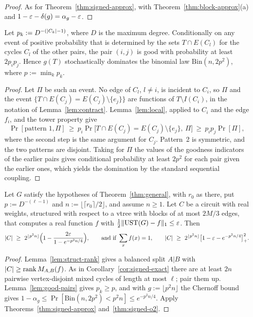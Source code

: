 \begin{proof}
As for Theorem~\ref{thm:signed-approx}, with Theorem~\ref{thm:block-approx}(a) and $1-\varepsilon-\delta(g)=\alpha_g-\varepsilon$.
\end{proof}

\begin{lemma}\label{lem:good-pairs}
Let $p_k:=D^{-(\lvert C_k\rvert-1)}$, where $D$ is the maximum degree. Conditionally on any event of positive probability that is determined by the sets $T\cap E(C_l)$ for the cycles $C_l$ of the other pairs, the pair $(i,j)$ is good with probability at least $2p_ip_j$. Hence $g(T)$ stochastically dominates the binomial law $\mathrm{Bin}(n,2p^2)$, where $p:=\min_kp_k$.
\end{lemma}

\begin{proof}
Let $\Pi$ be such an event. No edge of $C_l$, $l\ne i$, is incident to $C_i$, so $\Pi$ and the event $\{T\cap E(C_j)=E(C_j)\setminus\{e_j\}\}$ are functions of $T\setminus I(C_i)$, in the notation of Lemma~\ref{lem:contract}. Lemma~\ref{lem:local}, applied to $C_i$ and the edge $f_i$, and the tower property give
\[
  \Pr[\text{pattern 1},\Pi]\ \ge\ p_i\Pr\bigl[T\cap E(C_j)=E(C_j)\setminus\{e_j\},\ \Pi\bigr]\ \ge\ p_ip_j\Pr[\Pi],
\]
where the second step is the same argument for $C_j$. Pattern~2 is symmetric, and the two patterns are disjoint. Taking for $\Pi$ the values of the goodness indicators of the earlier pairs gives conditional probability at least $2p^2$ for each pair given the earlier ones, which yields the domination by the standard sequential coupling.
\end{proof}

\begin{corollary}\label{cor:signed-approx}
Let $G$ satisfy the hypotheses of Theorem~\ref{thm:general}, with $r_0$ as there, put $p:=D^{-(\ell-1)}$ and $n:=\lfloor\lceil r_0\rceil/2\rfloor$, and assume $n\ge1$. Let $C$ be a circuit with real weights, structured with respect to a vtree with blocks of at most $2M/3$ edges, that computes a real function $f$ with $\frac12\lVert \mathrm{UST}(G)-f\rVert_1\le\varepsilon$. Then
\[
  \lvert C\rvert\ \ge\ 2^{\lfloor p^2n\rfloor}\Bigl(1-\frac{2\varepsilon}{1-e^{-p^2n/4}}\Bigr),\qquad\text{and if }\sum_xf(x)=1,\qquad\lvert C\rvert\ \ge\ 2^{\lfloor p^2n\rfloor}\bigl[1-\varepsilon-e^{-p^2n/4}\bigr]_+^2 .
\]
\end{corollary}

\begin{proof}
Lemma~\ref{lem:struct-rank} gives a balanced split $A|B$ with $\lvert C\rvert\ge\operatorname{rank}M_{A,B}(f)$. As in Corollary~\ref{cor:signed-exact} there are at least $2n$ pairwise vertex-disjoint mixed cycles of length at most $\ell$; pair them up. Lemma~\ref{lem:good-pairs} gives $p_k\ge p$, and with $g:=\lfloor p^2n\rfloor$ the Chernoff bound gives $1-\alpha_g\le\Pr[\mathrm{Bin}(n,2p^2)<p^2n]\le e^{-p^2n/4}$. Apply Theorems~\ref{thm:signed-approx} and~\ref{thm:signed-o2}.
\end{proof}

